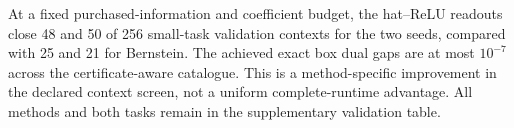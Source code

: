 At a fixed purchased-information and coefficient budget, the hat--ReLU readouts close 48 and 50 of 256 small-task validation contexts for the two seeds, compared with 25 and 21 for Bernstein. The achieved exact box dual gaps are at most $10^{-7}$ across the certificate-aware catalogue. This is a method-specific improvement in the declared context screen, not a uniform complete-runtime advantage. All methods and both tasks remain in the supplementary validation table.
